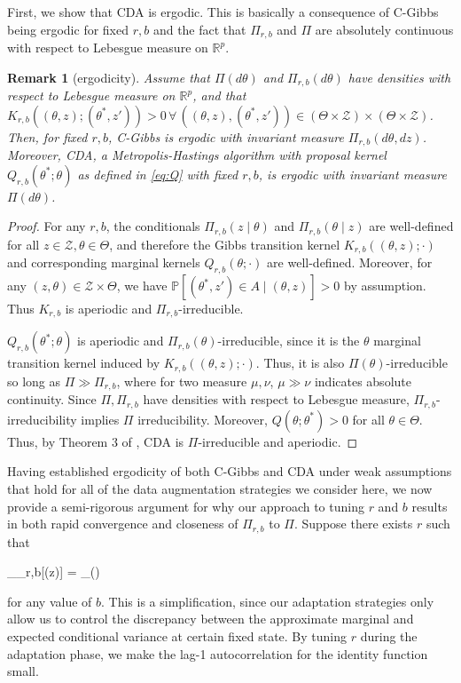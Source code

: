 \documentclass[10pt]{article}
\newtheorem{remark}{Remark}
\newcommand{\be}{\begin{equs}}
\newcommand{\ee}{\end{equs}}
\newcommand{\bb}[1]{\mathbb{#1}}
\newcommand{\mc}[1]{\mathcal{#1}}
\DeclareMathOperator{\var}{var}
\begin{document}
 First, we show that CDA is ergodic. This is basically a consequence of C-Gibbs being ergodic for fixed $r,b$ and the fact that $\Pi_{r,b}$ and $\Pi$ are absolutely continuous with respect to Lebesgue measure on $\bb R^p$.
\begin{remark}[ergodicity]
Assume that $\Pi(d\theta)$ and $\Pi_{r,b}(d\theta)$ have densities with respect to Lebesgue measure on $\bb R^p$, and that $K_{r,b}((\theta,z);(\theta^*,z'))>0 \,\forall\, ((\theta,z),(\theta^*,z')) \in (\Theta \times \mc Z) \times (\Theta \times \mc Z)$. Then, for fixed $r,b$, C-Gibbs is ergodic with invariant measure $\Pi_{r,b}(d\theta,dz)$. Moreover, CDA, a Metropolis-Hastings algorithm with proposal kernel $Q_{r,b}(\theta^*;\theta)$ as defined in \eqref{eq:Q} with fixed $r,b$, is ergodic with invariant measure $\Pi(d\theta)$.
\end{remark}
\begin{proof}
For any $r,b$, the conditionals $\Pi_{r,b}(z \mid \theta)$ and $\Pi_{r,b}(\theta \mid z)$ are well-defined for all $z \in \mc Z, \theta \in \Theta$, and therefore the Gibbs transition kernel $K_{r,b}((\theta,z);\cdot)$ and corresponding marginal kernels $Q_{r,b}(\theta;\cdot)$ are well-defined. Moreover, for any $(z,\theta) \in \mc Z \times \Theta$, we have $\bb P[(\theta^*,z') \in A \mid (\theta,z)] > 0$ by assumption. Thus $K_{r,b}$ is aperiodic and $\Pi_{r,b}$-irreducible.

$Q_{r,b}(\theta^*;\theta)$ is aperiodic and $\Pi_{r,b}(\theta)$-irreducible, since it is the $\theta$ marginal transition kernel induced by $K_{r,b}((\theta,z);\cdot)$. Thus, it is also $\Pi(\theta)$-irreducible so long as $\Pi \gg \Pi_{r,b}$, where for two measure $\mu,\nu$, $\mu \gg \nu$ indicates absolute continuity. Since $\Pi, \Pi_{r,b}$ have densities with respect to Lebesgue measure, $\Pi_{r,b}$-irreducibility implies $\Pi$ irreducibility. Moreover, $Q(\theta;\theta^*) > 0$ for all $\theta \in \Theta$. Thus, by Theorem 3 of \cite{roberts1994simple}, CDA is $\Pi$-irreducible and aperiodic. 
\end{proof}

Having established ergodicity of both C-Gibbs and CDA under weak assumptions that hold for all of the data augmentation strategies we consider here, we now provide a semi-rigorous argument for why our approach to tuning $r$ and $b$ results in both rapid convergence and closeness of $\Pi_{r,b}$ to $\Pi$. Suppose there exists $r$ such that
\be
\bb E_{\Pi_{r,b}}[\var(\theta \mid z)] = \var_{\Pi}(\theta)
\ee
for any value of $b$. This is a simplification, since our adaptation strategies only allow us to control the discrepancy between the approximate marginal and expected conditional variance at certain fixed state.
By tuning $r$ during the adaptation phase, we make the lag-1 autocorrelation for the identity function small. 
\end{document}
